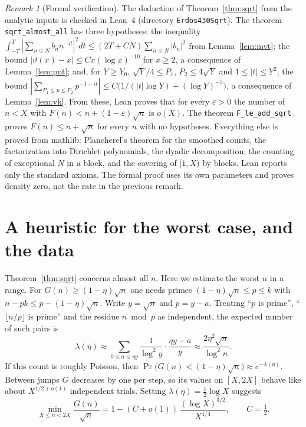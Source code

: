 \documentclass[11pt,letterpaper]{article}
\theoremstyle{remark}
\newtheorem{remark}[theorem]{Remark}
\begin{document}
\begin{remark}[Formal verification]\label{rem:leansqrt}
The deduction of Theorem~\ref{thm:sqrt} from the analytic inputs is checked in
Lean~4 (directory \texttt{Erdos430Sqrt}). The theorem
\texttt{sqrt\_almost\_all} has three hypotheses: the inequality
$\int_{-T}^{T}|\sum_{n\le N}b_nn^{-it}|^2dt\le(2T+CN)\sum_{n\le N}|b_n|^2$
from Lemma~\ref{lem:mvt}; the bound $|\vartheta(x)-x|\le Cx(\log x)^{-10}$ for
$x\ge2$, a consequence of Lemma~\ref{lem:pnt}; and, for $Y\ge Y_0$,
$\sqrt Y/4\le P_1$, $P_2\le4\sqrt Y$ and $1\le|t|\le Y^2$, the bound
$|\sum_{P_1\le p\le P_2}p^{-1-it}|\le C\bigl(1/(|t|\log Y)+(\log Y)^{-5}\bigr)$,
a consequence of Lemma~\ref{lem:vk}. From these, Lean proves that for every
$\varepsilon>0$ the number of $n<X$ with $F(n)<n+(1-\varepsilon)\sqrt n$ is
$o(X)$. The theorem \texttt{F\_le\_add\_sqrt} proves $F(n)\le n+\sqrt n$ for
every $n$ with no hypotheses. Everything else is proved from mathlib: Plancherel's
theorem for the smoothed counts, the factorization into Dirichlet polynomials,
the dyadic decomposition, the counting of exceptional $N$ in a block, and the
covering of $[1,X)$ by blocks. Lean reports only the standard axioms. The formal
proof uses its own parameters and proves density zero, not the rate in the
previous remark.
\end{remark}

\section{A heuristic for the worst case, and the data}

Theorem~\ref{thm:sqrt} concerns almost all $n$. Here we estimate the worst $n$
in a range. For $G(n)\ge(1-\eta)\sqrt n$ one needs primes $(1-\eta)\sqrt n\le p\le k$ with
$n-pk\le p-(1-\eta)\sqrt n$. Write $y=\sqrt n$ and $p=y-a$. Treating ``$p$ is
prime'', ``$\lfloor n/p\rfloor$ is prime'' and the residue $n\bmod p$ as
independent, the expected number of such pairs is
\[
\lambda(\eta)\approx\sum_{0\le a\le\eta y}\frac{1}{\log^2 y}\cdot\frac{\eta y-a}{y}
\approx\frac{2\eta^2\sqrt n}{\log^2 n}.
\]
If this count is roughly Poisson, then
$\Pr\bigl(G(n)<(1-\eta)\sqrt n\bigr)\approx e^{-\lambda(\eta)}$. Between
jumps $G$ decreases by one per step, so its values on $[X,2X]$ behave like
about $X^{1/2+o(1)}$ independent trials. Setting
$\lambda(\eta)=\tfrac12\log X$ suggests
\begin{equation}\label{eq:pred}
\min_{X\le n<2X}\frac{G(n)}{\sqrt n}= 1-(C+o(1))\,\frac{(\log X)^{3/2}}{X^{1/4}},
\qquad C=\tfrac12 .
\end{equation}
\end{document}
